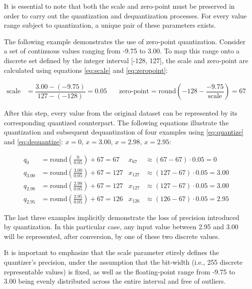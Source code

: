 {It is essential to note that both the scale and zero-point must be preserved in order to carry out the quantization and dequantization processes.
For every value range subject to quantization, a unique pair of these parameters exists.

The following example demonstrates the use of zero-point quantization. Consider a set of continuous values ranging from -9.75 to 3.00.
To map this range onto a discrete set defined by the integer interval [-128, 127], the scale and zero-point are calculated using equations \ref{eq:scale} and \ref{eq:zeropoint}:

\[
\begin{array}{rlrl}
\text{scale} &= \dfrac{3.00 - (-9.75)}{127 - (-128)} = 0.05
& \quad
\text{zero-point} &= \text{round}\!\left(-128 - \dfrac{-9.75}{\text{scale}}\right) = 67
\end{array}
\]

After this step, every value from the original dataset can be represented by its corresponding quantized counterpart.
The following equations illustrate the quantization and subsequent dequantization of four examples using \ref{eq:quantize} and \ref{eq:dequantize}:
\( x = 0 \), \( x = 3.00 \), \( x = 2.98 \), \( x = 2.95 \):

\[
\begin{array}{rlrl}
q_{0}     &= \text{round}\!\left(\tfrac{0}{0.05} \right) + 67 = 67
& x_{67}   &\approx (67 - 67)\cdot 0.05 = 0 \\[0.5ex]
q_{3.00}  &= \text{round}\!\left(\tfrac{3.00}{0.05} \right) + 67 = 127
& x_{127} &\approx (127 - 67)\cdot 0.05 = 3.00 \\[0.5ex]
q_{2.98}  &= \text{round}\!\left(\tfrac{2.98}{0.05} \right) + 67 = 127
& x_{127} &\approx (127 - 67)\cdot 0.05 = 3.00 \\[0.5ex]
q_{2.95}  &= \text{round}\!\left(\tfrac{2.95}{0.05} \right) + 67 = 126
& x_{126} &\approx (126 - 67)\cdot 0.05 = 2.95
\end{array}
\]


The last three examples implicitly demonstrate the loss of precision introduced by quantization.
In this particular case, any input value between 2.95 and 3.00 will be represented, after conversion, by one of these two discrete values.

It is important to emphasize that the scale parameter etirely defines the quantizer's precision,
under the assumption that the bit-width (i.e., 255 discrete representable values) is fixed,
as well as the floating-point range from -9.75 to 3.00 being evenly distributed across the entire interval and free of outliers.

}
